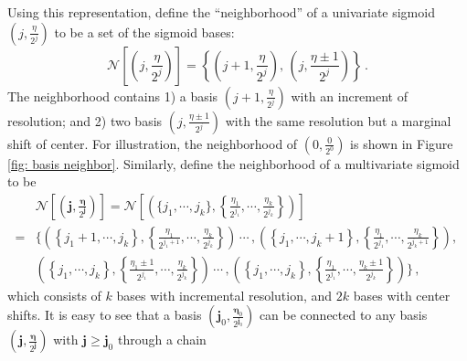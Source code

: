 Using this representation, define the ``neighborhood'' of a univariate sigmoid 
$(j,\frac{\eta}{2^j})$ to be a set of the sigmoid bases:
\begin{equation}
    \mathcal{N}\left[ \left(j,\frac{\eta}{2^j}\right) \right]
    = \left\{ 
        \left( j+1, \frac{\eta}{2^j} \right),\,
        \left( j, \frac{\eta\pm 1}{2^j} \right)
    \right\}\,.
    \label{eqn: neighborhood 1D}
\end{equation}
The neighborhood contains 1) a basis 
$\left( j+1, \frac{\eta}{2^j} \right)$ 
with an increment of resolution; and
2) two basis $\left( j, \frac{\eta\pm 1}{2^j} \right)$
with the same resolution but a marginal shift of center.
For illustration, the neighborhood of $\left(0,\frac{0}{2^0}\right)$
is shown in Figure \ref{fig: basis neighbor}.
Similarly, define the neighborhood of a multivariate sigmoid to be
\begin{equation}\begin{split}
    &\mathcal{N}
    \left[
         \left(
               \boldsymbol{j}, \frac{\boldsymbol{\eta}}{2^{\boldsymbol{j}}}
         \right)
    \right] = 
    \mathcal{N}\left[ \left(\{j_1, \cdots, j_k\} , \left\{
    \frac{\eta_1}{2^{j_1}}, \cdots, \frac{\eta_k}{2^{j_k}} \right\} \right) \right]\\
    = & \bigg\{
            \left( \left\{ j_1+1,\cdots, j_k\right\},
                   \left\{ \frac{\eta_1}{2^{j_1+1}}, \cdots, \frac{\eta_k}{2^{j_k}} \right\}
            \right) \, \cdots \, ,
            \left( \left\{ j_1,\cdots, j_k+1\right\},
                   \left\{ \frac{\eta_1}{2^{j_1}}, \cdots, \frac{\eta_k}{2^{j_k+1}} \right\}
            \right),\,   \\
          & 
            \left( \left\{ j_1,\cdots, j_k\right\},
                   \left\{ \frac{\eta_1\pm 1}{2^{j_1}}, \cdots, \frac{\eta_k}{2^{j_k}} \right\}
            \right) \, \cdots \, ,
            \left( \left\{ j_1,\cdots, j_k\right\},
                   \left\{ \frac{\eta_1}{2^{j_1}}, \cdots, \frac{\eta_k\pm 1}{2^{j_k}} \right\}
            \right) \bigg\}\,,
    \label{eqn: neighborhood kD}
\end{split}\end{equation}
which consists of $k$ bases with incremental resolution, and $2k$ bases with center shifts.
It is easy to see that a basis $(\boldsymbol{j}_0, \frac{\boldsymbol{\eta}_0}{2^{\boldsymbol{j}_0}})$ 
can be connected to any basis $(\boldsymbol{j}, \frac{\boldsymbol{\eta}}{2^{\boldsymbol{j}}})$ 
with $\boldsymbol{j} \ge \boldsymbol{j}_0$ through a chain
